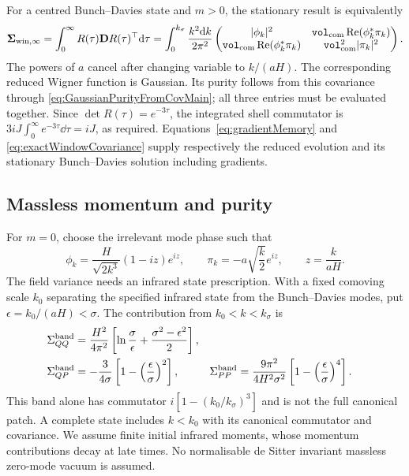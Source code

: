 \documentclass{article}
\newcommand{\VF}{\mathtt{vol}_{\rm com}}
\numberwithin{equation}{section}
\begin{document}
For a centred Bunch--Davies state and $m>0$, the stationary result is equivalently
\begin{equation}
 \mathbf\Sigma_{{\rm win},\infty}
 =\int_0^\infty R(\tau)\mathbf D R(\tau)^\top\dd\tau
 =\int_0^{k_\sigma}\frac{k^2\dd k}{2\pi^2}
 \begin{pmatrix}
 |\phi_k|^2&\VF\operatorname{Re}(\phi_k^*\pi_k)\\
 \VF\operatorname{Re}(\phi_k^*\pi_k)&\VF^2|\pi_k|^2
 \end{pmatrix}.
 \label{eq:exactWindowCovariance}
\end{equation}
The powers of $a$ cancel after changing variable to $k/(aH)$. The corresponding reduced Wigner function is Gaussian. Its purity follows from this covariance through \cref{eq:GaussianPurityFromCovMain}; all three entries must be evaluated together. Since $\det R(\tau)=e^{-3\tau}$, the integrated shell commutator is $3iJ\int_0^\infty e^{-3\tau}\dd\tau=iJ$, as required. Equations~\eqref{eq:gradientMemory} and \eqref{eq:exactWindowCovariance} supply respectively the reduced evolution and its stationary Bunch--Davies solution including gradients.

\subsection{Massless momentum and purity}
\label{sec:gradientMassless}

For $m=0$, choose the irrelevant mode phase such that
\begin{equation}
 \phi_k=\frac{H}{\sqrt{2k^3}}(1-iz)e^{iz},\qquad
 \pi_k=-a\sqrt{\frac{k}{2}}e^{iz},\qquad z=\frac{k}{aH}.
\end{equation}
The field variance needs an infrared state prescription. With a fixed comoving scale $k_0$ separating the specified infrared state from the Bunch--Davies modes, put $\epsilon=k_0/(aH)<\sigma$. The contribution from $k_0<k<k_\sigma$ is
\begin{subequations}\label{eq:masslessWindowRegulated}
\begin{align}
 \Sigma_{QQ}^{\rm band}&=\frac{H^2}{4\pi^2}\left[\ln\frac{\sigma}{\epsilon}+\frac{\sigma^2-\epsilon^2}{2}\right],\\
 \Sigma_{QP}^{\rm band}&=-\frac{3}{4\sigma}\left[1-\left(\frac\epsilon\sigma\right)^2\right],
 &\Sigma_{PP}^{\rm band}&=\frac{9\pi^2}{4H^2\sigma^2}\left[1-\left(\frac\epsilon\sigma\right)^4\right].
\end{align}
\end{subequations}
This band alone has commutator $i[1-(k_0/k_\sigma)^3]$ and is not the full canonical patch. A complete state includes $k<k_0$ with its canonical commutator and covariance. We assume finite initial infrared moments, whose momentum contributions decay at late times. No normalisable de Sitter invariant massless zero-mode vacuum is assumed.
\end{document}

